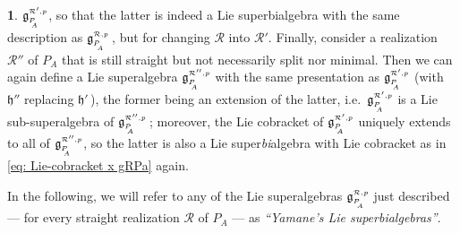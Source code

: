 \documentclass[12pt,reqno,twoside,a4paper]{amsart}
\numberwithin{equation}{section}
\theoremstyle{definition}
\newtheorem{free text}[lema]{}
\theoremstyle{remark}
\newcommand{\R}{{\mathcal R}}
\def \Apicc {{\scriptscriptstyle A}}
\def \Ppicc {{\scriptscriptstyle P}}
\def \lieg{\mathfrak{g}}
\def \liegRpPa{\mathfrak{g}^{\raise1pt\hbox{$ \scriptscriptstyle \mathcal{R},p $}}_{\Ppicc_{\raise-3pt\hbox{$ \scriptscriptstyle \!\! A $}}}}
\def \lieh{\mathfrak{h}}
\theoremstyle{plain}
\begin{document}
\begin{free text}
   $ \lieg^{\raise1pt\hbox{$ \scriptscriptstyle \R',p $}}_{\Ppicc_{\raise-3pt\hbox{$ \!\!
   \Apicc $}}} $,
   so that the latter is indeed a Lie superbialgebra with the same description as
   $ \liegRpPa \, $,  but for changing  $ \R $  into  $ \R' $.  Finally, consider a realization
   $ \R'' $  of  $ P_\Apicc $  that is still straight but not necessarily split nor minimal.
   Then we can again define a Lie superalgebra
   $ \lieg^{\raise1pt\hbox{$ \scriptscriptstyle \R'',p $}}_{\Ppicc_{\raise-3pt\hbox{$ \!\!
   \Apicc $}}} $  with the same presentation as
   $ \lieg^{\raise1pt\hbox{$ \scriptscriptstyle \R',p $}}_{\Ppicc_{\raise-3pt\hbox{$ \!\!
   \Apicc $}}} $  (with  $ \lieh'' $  replacing  $ \lieh' \, $),
   the former being an extension of the latter, i.e.\
   $ \lieg^{\raise1pt\hbox{$ \scriptscriptstyle \R',p $}}_{\Ppicc_{\raise-3pt\hbox{$ \!\!
   \Apicc $}}} $
   is a Lie sub-superalgebra of  $ \lieg^{\raise1pt\hbox{$ \scriptscriptstyle \R'',p $}}_{\Ppicc_{\raise-3pt\hbox{$ \!\! \Apicc $}}} \, $;
   moreover, the Lie cobracket of  $ \lieg^{\raise1pt\hbox{$ \scriptscriptstyle \R',p $}}_{\Ppicc_{\raise-3pt\hbox{$ \!\! \Apicc $}}} $
   uniquely extends to all of
   $ \lieg^{\raise1pt\hbox{$ \scriptscriptstyle \R'',p $}}_{\Ppicc_{\raise-3pt\hbox{$ \!\!
   \Apicc $}}} $,
   so the latter is also a Lie  super\textsl{bi\/}algebra with Lie cobracket as in
   \eqref{eq: Lie-cobracket x gRPa}  again.
                                                          \par
   In the following, we will refer to any of the Lie superalgebras  $ \liegRpPa $
   just described   --- for every straight realization  $ \R $  of  $ P_\Apicc $  ---
   as \textit{``Yamane's Lie superbialgebras''}.
%
\end{free text}

\vskip11pt
\end{document}
